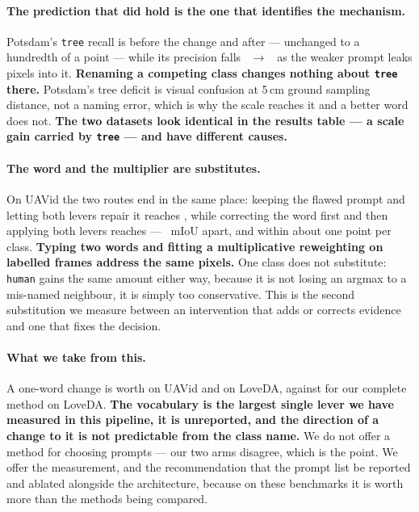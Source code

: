 \documentclass[10pt,a4paper]{article}                        %
\newcommand{\best}[1]{\textbf{#1}}
\begin{document}
\paragraph{The prediction that did hold is the one that identifies the mechanism.}
Potsdam's \texttt{tree} recall is \vocPotsTreeRec{} before the change and
\vocPotsTreeRec{} after --- unchanged to a hundredth of a point --- while its
precision falls \vocPotsTreePrecA{}~$\to$~\vocPotsTreePrecB{} as the weaker prompt
leaks pixels into it. \best{Renaming a competing class changes nothing about
\texttt{tree} there.} Potsdam's tree deficit is visual confusion at 5\,cm
ground sampling distance, not a naming error, which is why the scale reaches it and
a better word does not. \best{The two datasets look identical in the results table
--- a scale gain carried by \texttt{tree} --- and have different causes.}

\paragraph{\best{The word and the multiplier are substitutes.}} On UAVid the two
routes end in the same place: keeping the flawed prompt and letting both levers
repair it reaches \vocRouteA{}, while correcting the word first and then applying
both levers reaches \vocRouteB{} --- \vocRouteDelta{}~mIoU apart, and within about
one point per class. \best{Typing two words and fitting a multiplicative reweighting
on \uavTrainTiles{} labelled frames address the same pixels.} One class does not
substitute: \texttt{human} gains the same amount either way, because it is not
losing an argmax to a mis-named neighbour, it is simply too conservative. This is
the second substitution we measure between an intervention that adds or corrects
evidence and one that fixes the decision.

\paragraph{What we take from this.} A one-word change is worth \vocUavGain{} on
UAVid and \vocLoveBarren{} on LoveDA, against \loveTotal{} for our complete
method on LoveDA. \best{The vocabulary is the largest single lever we have measured
in this pipeline, it is unreported, and the direction of a change to it is not
predictable from the class name.} We do not offer a method for choosing prompts ---
our two arms disagree, which is the point. We offer the measurement, and the
recommendation that the prompt list be reported and ablated alongside the
architecture, because on these benchmarks it is worth more than the methods being
compared.
\end{document}
